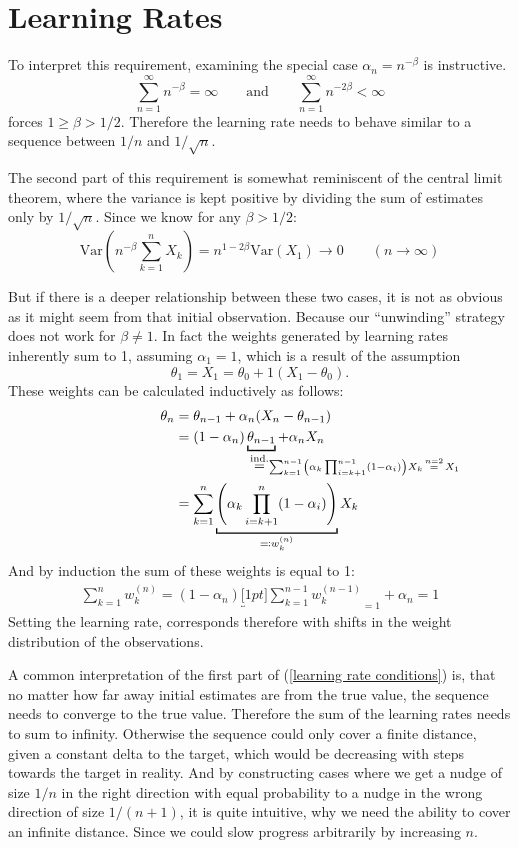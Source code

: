 \section{Learning Rates}
To interpret this requirement, examining the special case \(\alpha_n=n^{-\beta}\) is instructive.
\[
    \sum_{n=1}^\infty n^{-\beta}=\infty \qquad \text{and}\qquad \sum_{n=1}^\infty n^{-2\beta}<\infty
\]
forces \(1\ge \beta >1/2\). Therefore the learning rate needs to behave similar to a sequence between \(1/n\) and \(1/\sqrt{n}\). 

The second part of this requirement is somewhat reminiscent of the central limit theorem, where the variance is kept positive by dividing the sum of estimates only by \(1/\sqrt{n}\). Since we know for any \(\beta>1/2\):
\[
    \text{Var}\left(n^{-\beta}\sum_{k=1}^n X_k \right)=n^{1-2\beta}\text{Var}(X_1)\to 0 \qquad (n\to \infty)
\]

But if there is a deeper relationship between these two cases, it is not as obvious as it might seem from that initial observation. Because our ``unwinding'' strategy does not work for \(\beta \neq 1\). In fact the weights generated by learning rates inherently sum to 1, assuming \(\alpha_1=1\), which is a result of the assumption 
\[
    \theta_1=X_1=\theta_0+1(X_1-\theta_0).
\]
These weights can be calculated inductively as follows:
\begin{align*}
    \theta_n&=\theta_{n-1} + \alpha_n(X_n -\theta_{n-1})\\
    &=(1-\alpha_n)\underbracket[1pt]{\theta_{n-1}}_{
        \lxeq{\text{ind.}}
        \mathrlap{\sum_{k=1}^{n-1} \left(\alpha_k \prod_{i=k+1}^{n-1}(1-\alpha_i)\right)X_k \xeq{n=2} X_1}
    }
    + \alpha_n X_n\\
    & = \sum_{k=1}^n \underbracket[1pt]{
        \left(\alpha_k \prod_{i=k+1}^{n}(1-\alpha_i)\right)
        }_{
            \eqqcolon w_k^{(n)}
        } X_k
\end{align*}
And by induction the sum of these weights is equal to 1:
\begin{align*}
    \sum_{k=1}^n w_k^{(n)} = (1-\alpha_n)\underbracket[1pt]{\sum_{k=1}^{n-1}w_k^{(n-1)}}_{=1} + \alpha_n =1
\end{align*}
Setting the learning rate, corresponds therefore with shifts in the weight distribution of the observations.


A common interpretation of the first part of (\ref{learning rate conditions}) is, that no matter how far away initial estimates are from the true value, the sequence needs to converge to the true value. Therefore the sum of the learning rates needs to sum to infinity. Otherwise the sequence could only cover a finite distance, given a constant delta to the target, which would be decreasing with steps towards the target in reality. And by constructing cases where we get a nudge of size \(1/n\) in the right direction with equal probability to a nudge in the wrong direction of size \(1/(n+1)\), it is quite intuitive, why we need the ability to cover an infinite distance. Since we could slow progress arbitrarily by increasing \(n\). 

